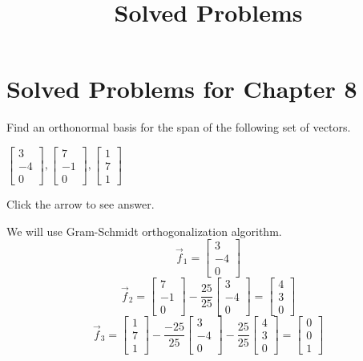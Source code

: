 \documentclass{ximera}
\title{Solved Problems} \license{CC BY-NC-SA 4.0}
\begin{document}
\begin{abstract}
\end{abstract}
\maketitle

\section*{Solved Problems for Chapter 8}

\begin{problem}\label{prob:orth_basis1}
    Find an orthonormal basis for the span of the following set of
vectors.


$\left[
\begin{array}{r}
 3 \\
-4 \\
0
\end{array}
\right] ,\left[
\begin{array}{r}
 7 \\
-1 \\
0
\end{array}
\right] ,\left[
\begin{array}{r}
 1 \\
7 \\
1
\end{array}
\right] $

Click the arrow to see answer.
\begin{expandable}
We will use Gram-Schmidt orthogonalization algorithm.
$$\vec{f}_1=\begin{bmatrix}3\\-4\\0\end{bmatrix}$$
$$\vec{f}_2=\begin{bmatrix}7\\-1\\0\end{bmatrix}-\frac{25}{25}\begin{bmatrix}3\\-4\\0\end{bmatrix}=\begin{bmatrix}4\\3\\0\end{bmatrix}$$
$$\vec{f}_3=\begin{bmatrix}1\\7\\1\end{bmatrix}-\frac{-25}{25}\begin{bmatrix}3\\-4\\0\end{bmatrix}-\frac{25}{25}\begin{bmatrix}4\\3\\0\end{bmatrix}=\begin{bmatrix}0\\0\\1\end{bmatrix}$$


\end{expandable}
\end{problem}
\end{document}
